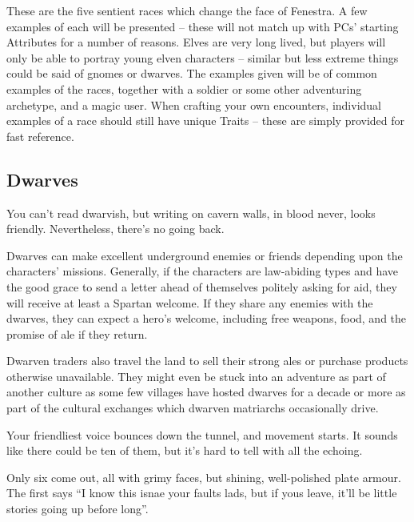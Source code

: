 \begin{multicols}{2}

\noindent
These are the five sentient races which change the face of Fenestra.
A few examples of each will be presented -- these will not match up with PCs' starting Attributes for a number of reasons.
Elves are very long lived, but players will only be able to portray young elven characters -- similar but less extreme things could be said of gnomes or dwarves.
The examples given will be of common examples of the races, together with a soldier or some other adventuring archetype, and a magic user.
When crafting your own encounters, individual examples of a race should still have unique Traits -- these are simply provided for fast reference.

\subsection{Dwarves}

\begin{boxtext}

  You can't read dwarvish, but writing on cavern walls, in blood never, looks friendly.
  Nevertheless, there's no going back.

\end{boxtext}

Dwarves can make excellent underground enemies or friends depending upon the characters' missions.
Generally, if the characters are law-abiding types and have the good grace to send a letter ahead of themselves politely asking for aid, they will receive at least a Spartan welcome.
If they share any enemies with the dwarves, they can expect a hero's welcome, including free weapons, food, and the promise of ale if they return.

Dwarven traders also travel the land to sell their strong ales or purchase products otherwise unavailable.
They might even be stuck into an adventure as part of another culture as some few villages have hosted dwarves for a decade or more as part of the cultural exchanges which dwarven matriarchs occasionally drive.

\begin{boxtext}

  Your friendliest voice bounces down the tunnel, and movement starts.
  It sounds like there could be ten of them, but it's hard to tell with all the echoing.

  Only six come out, all with grimy faces, but shining, well-polished plate armour.
  The first says ``I know this isnae your faults lads, but if yous leave, it'll be little stories going up before long''.


\end{boxtext}
\end{multicols}
